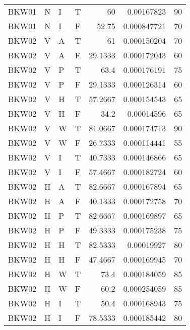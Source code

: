 \begin{longtable}{llllrrr}
    BKW01    & N     & I     & T          & 60         & 0.00167823  & 90       \\
    BKW01    & N     & I     & F          & 52.75      & 0.000847721 & 70       \\
    BKW02    & V     & A     & T          & 61         & 0.000150204 & 70       \\
    BKW02    & V     & A     & F          & 29.1333    & 0.000172043 & 60       \\
    BKW02    & V     & P     & T          & 63.4       & 0.000176191 & 75       \\
    BKW02    & V     & P     & F          & 29.1333    & 0.000126314 & 60       \\
    BKW02    & V     & H     & T          & 57.2667    & 0.000154543 & 65       \\
    BKW02    & V     & H     & F          & 34.2       & 0.00014596  & 65       \\
    BKW02    & V     & W     & T          & 81.0667    & 0.000174713 & 90       \\
    BKW02    & V     & W     & F          & 26.7333    & 0.000114441 & 55       \\
    BKW02    & V     & I     & T          & 40.7333    & 0.000146866 & 65       \\
    BKW02    & V     & I     & F          & 57.4667    & 0.000182724 & 60       \\
    BKW02    & H     & A     & T          & 82.6667    & 0.000167894 & 65       \\
    BKW02    & H     & A     & F          & 40.1333    & 0.000172758 & 70       \\
    BKW02    & H     & P     & T          & 82.6667    & 0.000169897 & 65       \\
    BKW02    & H     & P     & F          & 49.3333    & 0.000175238 & 75       \\
    BKW02    & H     & H     & T          & 82.5333    & 0.00019927  & 80       \\
    BKW02    & H     & H     & F          & 47.4667    & 0.000169945 & 70       \\
    BKW02    & H     & W     & T          & 73.4       & 0.000184059 & 85       \\
    BKW02    & H     & W     & F          & 60.2       & 0.000254059 & 85       \\
    BKW02    & H     & I     & T          & 50.4       & 0.000168943 & 75       \\
    BKW02    & H     & I     & F          & 78.5333    & 0.000185442 & 80       \\

\end{longtable}
